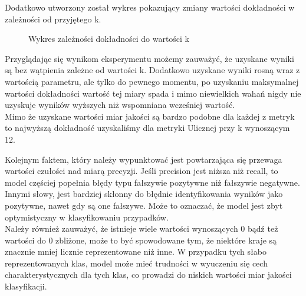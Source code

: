 \documentclass{article}
\begin{document}
\newpage

\noindent Dodatkowo utworzony został wykres pokazujący zmiany wartości dokładności w zależności od przyjętego k.

\begin{figure}[H]
    \centering
    \caption{Wykres zależności dokładności do wartości k}
    \label{fig:szum_jednostkowy_bin}
\end{figure}

\noindent Przyglądając się wynikom eksperymentu możemy zauważyć, że uzyskane wyniki są bez wątpienia zależne od wartości k. Dodatkowo uzyskane wyniki rosną wraz z wartością parametru, ale tylko do pewnego momentu, po uzyskaniu maksymalnej wartości dokładności wartość tej miary spada i mimo niewielkich wahań nigdy nie uzyskuje wyników wyższych niż wspomniana wcześniej wartość. \\

\noindent Mimo że uzyskane wartości miar jakości są bardzo podobne dla każdej z metryk to najwyższą dokładność uzyskaliśmy dla metryki Ulicznej przy k wynoszącym 12. \\

\newpage

\noindent Kolejnym faktem, który należy wypunktować jest powtarzająca się przewaga wartości czułości nad miarą precyzji. Jeśli precision jest niższa niż recall, to model częściej popełnia błędy typu fałszywie pozytywne niż fałszywie negatywne. Innymi słowy, jest bardziej skłonny do błędnie identyfikowania wyników jako pozytywne, nawet gdy są one fałszywe. Może to oznaczać, że model jest zbyt optymistyczny w klasyfikowaniu przypadków. \\

\noindent Należy również zauważyć, że istnieje wiele wartości wynoszących 0 bądź też wartości do 0 zbliżone, może to być spowodowane tym, że niektóre kraje są znacznie mniej licznie reprezentowane niż inne. W przypadku tych słabo reprezentowanych klas, model może mieć trudności w wyuczeniu się cech charakterystycznych dla tych klas, co prowadzi do niskich wartości miar jakości klasyfikacji.
\end{document}
